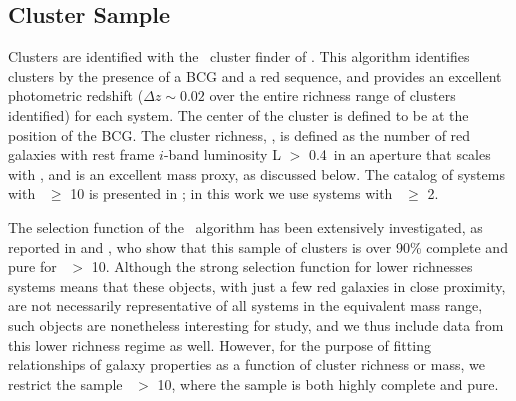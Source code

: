 \documentclass{emulateapj}
\begin{document}
\begin{figure*}
 \end{figure*}

\subsection{Cluster Sample} 
\label{sec:clustersamp} 
Clusters are identified with the \maxbcg\ cluster finder of
\citet{Koester07a}. This algorithm identifies clusters by the presence
of a BCG and a red sequence, and provides an excellent photometric
redshift ($\Delta z \sim 0.02$ over the entire richness range of clusters identified) for each system. The center of the cluster is defined to be
at the position of the BCG. The cluster richness, \Ntwo, is defined as
the number of red galaxies with rest frame $i$-band luminosity L $>$ 0.4\Lstar\ in an aperture that scales with \rtwo, and
is an excellent mass proxy, as discussed below. The catalog of systems
with \Ntwo\ $\ge$ 10 is presented in \citet{Koester07b}; in this work
we use systems with \Ntwo\ $\ge$ 2.

The selection function of the \maxbcg\ algorithm has been extensively
investigated, as reported in \citet{Koester07a} and \citet{Rozo07a},
who show that this sample of clusters is over 90\% complete and pure
for \Ntwo\ $>$ 10. Although the strong selection function for lower
richnesses systems means that these objects, with just a few red
galaxies in close proximity, are not necessarily representative of all systems in the
equivalent mass range, such objects are nonetheless interesting for
study, and we thus include data from this lower richness regime as
well. However, for the purpose of fitting relationships of galaxy
properties as a function of cluster richness or mass, we restrict the
sample \Ntwo\ $>$ 10, where the sample is both highly complete and
pure.
\end{document}
